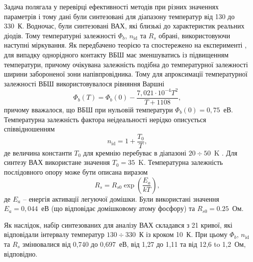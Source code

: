 Задача полягала у перевірці ефективності методів при різних значеннях параметрів і тому дані були синтезовані для діапазону температур від 130 до 330~К.
Водночас, були синтезовані ВАХ, які близькі до характеристик реальних діодів.
Тому температурні залежності $\Phi_b$, $n_\mathrm{id}$ та $R_s$ обрані, використовуючи наступні міркування.
Як передбачено теорією \cite{Rhoderick1988} та спостережено на експерименті \cite{Aboelfotoh,Zhua},
для випадку однорідного контакту  ВБШ має зменшуватись із підвищенням температури, причому очікувана залежність подібна до температурної залежності ширини забороненої зони напівпровідника.
Тому для апроксимації температурної залежності ВБШ використовувалося рівняння Варшні \cite{SiEg2012}
\begin{equation}
\label{eqFbT}
\Phi_b(T) = \Phi_b(0) - \frac{7,021\cdot10^{-4} T^2}{T + 1108} ,
\end{equation}
причому вважалося, що ВБШ при нульовій температури $\Phi_b(0)=0,75$~еВ.
Температурна залежність фактора неідеальності нерідко описується співвідношенням
\begin{equation}
\label{eqnT}
n_\mathrm{id}=1+\frac{T_0}{T},
\end{equation}
де величина константи $T_0$ для кремнію перебуває в діапазоні $20\div50$~K \cite{T0:Lee,T0:McCafferty,T0:Saxena,Aboelfotoh}.
Для синтезу ВАХ використане значення $T_0=35$~K.
Температурна залежність послідовного опору може бути описана виразом \cite{Sze2012,Rs:Meyaard,Rs:Kang}
\begin{equation}
\label{eqRsT}
R_s=R_{s0}\exp\left(\frac{E_a}{kT}\right),
\end{equation}
де $E_a$ -- енергія активації легуючої домішки.
Були використані значення $E_a=0,044$~еВ (що відповідає домішковому атому фосфору) та $R_{s0}=0.25$~Ом.

Як наслідок, набір синтезованих для аналізу ВАХ складався з 21 кривої, які відповідали інтервалу температур $130\div330$~К із кроком 10~К.
При цьому  $\Phi_b$, $n_\mathrm{id}$ та $R_s$ змінювалися від 0,740 до 0,697~еВ, від 1,27 до 1,11 та від 12,6 to 1,2~Ом, відповідно.


